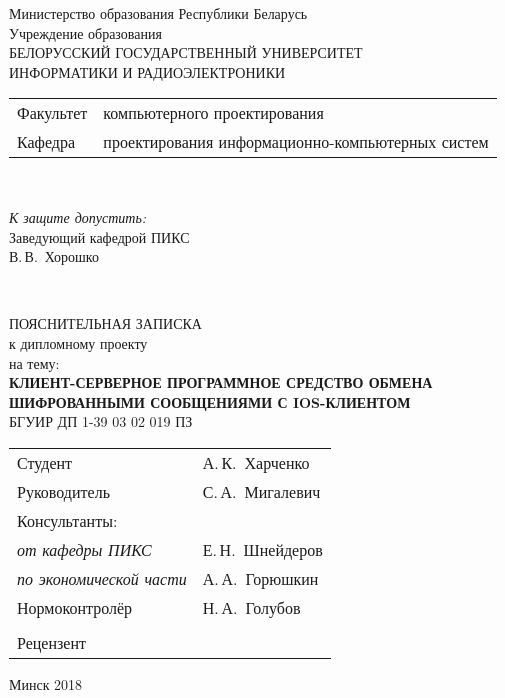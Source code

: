 \begin{titlepage}
  \begin{center}
    Министерство образования Республики Беларусь\\[1em]
    Учреждение образования\\
    БЕЛОРУССКИЙ ГОСУДАРСТВЕННЫЙ УНИВЕРСИТЕТ \\
    ИНФОРМАТИКИ И РАДИОЭЛЕКТРОНИКИ\\[1em]

    \begin{minipage}{\textwidth}
      \begin{flushleft}
        \begin{tabular}{ l l }
          Факультет & компьютерного проектирования\\
          Кафедра   & проектирования информационно-компьютерных систем
        \end{tabular}
      \end{flushleft}
    \end{minipage}\\[3em]

    \begin{flushright}
      \begin{minipage}{0.4\textwidth}
        \textit{К защите допустить:}\\[0.8em]
        Заведующий кафедрой ПИКС\\[0.45em]
        \underline{\hspace*{2.8cm}} В.\,В.~Хорошко
      \end{minipage}\\[2.2em]
    \end{flushright}

    {ПОЯСНИТЕЛЬНАЯ ЗАПИСКА}\\
    {к дипломному проекту}\\
    {на тему:}\\[1em]
    \textbf{\large\MakeUppercase{Клиент-серверное программное средство обмена шифрованными сообщениями с iOS-клиентом}}\\[1em]


    {БГУИР ДП 1-39 03 02 019 ПЗ}\\[2em]
    
    \begin{tabular}{ p{}p{} }
      Студент & А.\,К.~Харченко \\
      Руководитель & С.\,А.~Мигалевич \\
      Консультанты: &\\
      \hspace*{3ex}\emph{от кафедры ПИКС} & Е.\,Н.~Шнейдеров \\
      \hspace*{3ex}\emph{по экономической части} & А.\,А.~Горюшкин \\
      Нормоконтролёр & Н.\,А.~Голубов\\
      & \\
      Рецензент & \\
    \end{tabular}
    
    \vfill
    {\normalsize Минск 2018}
  \end{center}
\end{titlepage}

